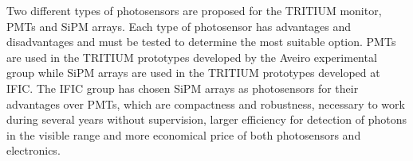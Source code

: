 Two different types of photosensors are proposed for the TRITIUM monitor, PMTs and SiPM arrays. Each type of photosensor has advantages and disadvantages and must be tested to determine the most suitable option. PMTs are used in the TRITIUM prototypes developed by the Aveiro experimental group while SiPM arrays are used in the TRITIUM prototypes developed at IFIC. The IFIC group has chosen SiPM arrays as photosensors for their advantages over PMTs, which are compactness and robustness, necessary to work during several years without supervision, larger efficiency for detection of photons in the visible range and more economical price of both photosensors and electronics.